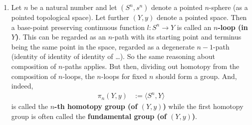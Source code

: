 \begin{enumerate}
is homotopic to the homotopy
\begin{align*}
  \left(
    \mathrm{id}_{p_{2}}
    \circ^{\textrm{h}}
    L(p_{1})
  \right)
  \circ
  A(p_{1},\mathrm{const}_{p_{1}(1)},p_{2})
\end{align*}
both from
\begin{align*}
  \left(
    p_{2}
    \circ
    \mathrm{const}_{p_{1}(1)}
  \right)
  \circ
  p_{1}
\end{align*}
to
\begin{align*}
  p_{2}
  \circ
  p_{1}
\end{align*}
This means the diagram
\[
\begin{tikzcd}[sep=large]
  \left(
    p_{2}
    \circ
    \mathrm{const}_{p_{1}(1)}
  \right)
  \circ
  p_{1}
  \arrow{rr}{A(p_{1},\mathrm{const}_{p_{1}(1)},p_{2})}
  \arrow[swap]{dr}{R(p_{2}) \circ^{\textrm{h}} \mathrm{id}_{p_{1}}}
  &
  &
  p_{2}
  \circ
  \left(
    \mathrm{const}_{p_{1}(1)}
    \circ
    p_{1}
  \right)
  \arrow{dl}{\mathrm{id}_{p_{2}} \circ^{\textrm{h}} L(p_{1})}
  \\
  &
  p_{2}
  \circ
  p_{1}
  &
\end{tikzcd}
\]
commutes up to homotopy.
This is known as the triangle identity.
And deriving the unit laws up to coherent homotopy from the triangle identity can be considered a so-called {\glqq}coherence theorem{\grqq} for the {\glqq}coherence condition{\grqq} imposed by the triangle identity.
In both cases the homotopies making the diagrams {\glqq}commute{\grqq} satisfy their own coherence conditions and so on.
\cite{69cbf29c} seems to be a good source to gain insight into this process.
\item[$\bullet$]
Let $n$ be a natural number and let $(S^{n},s^{n})$ denote a pointed $n$-sphere (as a pointed topological space).
Let further $(Y,y)$ denote a pointed space.
Then a base-point preserving continuous function $l \colon S^{n} \rightarrow Y$ is called an \textbf{$n$-loop (in $Y$)}.
This can be regarded as an $n$-path with its starting point and terminus being the same point in the space, regarded as a degenerate $n-1$-path (identity of identity of identity of \ldots).
So the same reasoning about composition of $n$-paths applies.
But then, dividing out homotopy from the composition of $n$-loops, the $n$-loops for fixed $n$ should form a group.
And, indeed,
\begin{align*}
  \pi_{n}(Y,y)
  &:=
  \langle
    S^{n},
    Y
  \rangle
\end{align*}
is called the \textbf{$n$-th homotopy group (of $(Y,y)$)} while the first homotopy group is often called the \textbf{fundamental group (of $(Y,y)$)}.

\end{enumerate}
